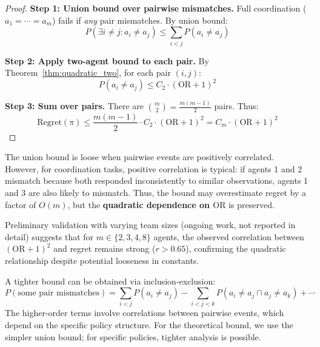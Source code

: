 \begin{proof}
\textbf{Step 1: Union bound over pairwise mismatches.}
Full coordination ($a_1 = \cdots = a_m$) fails if \textit{any} pair mismatches. By union bound:
\begin{equation}
P(\exists i \neq j : a_i \neq a_j) \leq \sum_{i < j} P(a_i \neq a_j)
\end{equation}

\textbf{Step 2: Apply two-agent bound to each pair.}
By Theorem~\ref{thm:quadratic_two}, for each pair $(i, j)$:
\begin{equation}
P(a_i \neq a_j) \leq C_2 \cdot (\text{OR} + 1)^2
\end{equation}

\textbf{Step 3: Sum over pairs.}
There are $\binom{m}{2} = \frac{m(m-1)}{2}$ pairs. Thus:
\begin{equation}
\text{Regret}(\pi) \leq \frac{m(m-1)}{2} \cdot C_2 \cdot (\text{OR} + 1)^2 = C_m \cdot (\text{OR} + 1)^2
\end{equation}
\end{proof}

\begin{remark}
\label{rem:tightness}
The union bound is loose when pairwise events are positively correlated. However, for coordination tasks, positive correlation is typical: if agents 1 and 2 mismatch because both responded inconsistently to similar observations, agents 1 and 3 are also likely to mismatch. Thus, the bound may overestimate regret by a factor of $O(m)$, but the \textbf{quadratic dependence on $\text{OR}$} is preserved.

Preliminary validation with varying team sizes (ongoing work, not reported in detail) suggests that for $m \in \{2, 3, 4, 8\}$ agents, the observed correlation between $(\text{OR} + 1)^2$ and regret remains strong ($r > 0.65$), confirming the quadratic relationship despite potential looseness in constants.
\end{remark}

\begin{remark}
\label{rem:inclusion_exclusion}
A tighter bound can be obtained via inclusion-exclusion:
\begin{equation}
P(\text{some pair mismatches}) = \sum_{i<j} P(a_i \neq a_j) - \sum_{i<j<k} P(a_i \neq a_j \cap a_j \neq a_k) + \cdots
\end{equation}
The higher-order terms involve correlations between pairwise events, which depend on the specific policy structure. For the theoretical bound, we use the simpler union bound; for specific policies, tighter analysis is possible.
\end{remark}

